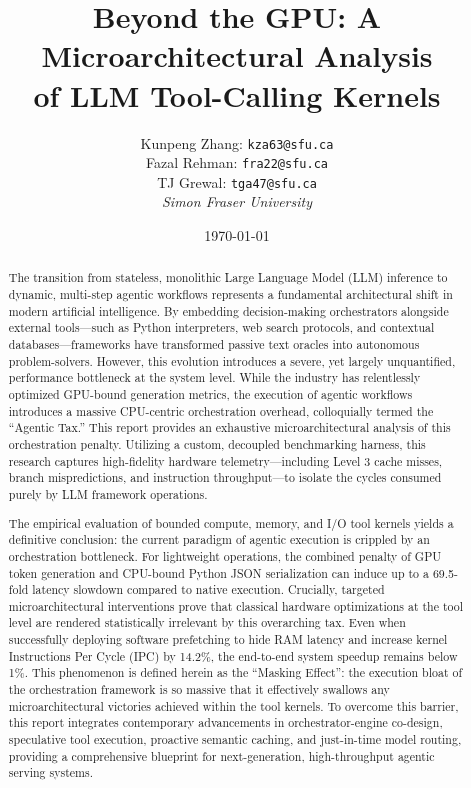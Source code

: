 \documentclass[10pt, letterpaper]{article}
\title{\textbf{Beyond the GPU: A Microarchitectural Analysis \\ \large of LLM Tool-Calling Kernels}}
\author{
    Kunpeng Zhang: \texttt{kza63@sfu.ca} \\
    Fazal Rehman: \texttt{fra22@sfu.ca} \\
    TJ Grewal: \texttt{tga47@sfu.ca} \\
    \vspace{0.5em}
    \textit{Simon Fraser University}
}
\date{\today}
\begin{document}
\maketitle

\begin{abstract}
The transition from stateless, monolithic Large Language Model (LLM) inference to dynamic, multi-step agentic workflows represents a fundamental architectural shift in modern artificial intelligence. By embedding decision-making orchestrators alongside external tools---such as Python interpreters, web search protocols, and contextual databases---frameworks have transformed passive text oracles into autonomous problem-solvers. However, this evolution introduces a severe, yet largely unquantified, performance bottleneck at the system level. While the industry has relentlessly optimized GPU-bound generation metrics, the execution of agentic workflows introduces a massive CPU-centric orchestration overhead, colloquially termed the ``Agentic Tax.'' This report provides an exhaustive microarchitectural analysis of this orchestration penalty. Utilizing a custom, decoupled benchmarking harness, this research captures high-fidelity hardware telemetry---including Level 3 cache misses, branch mispredictions, and instruction throughput---to isolate the cycles consumed purely by LLM framework operations. 

The empirical evaluation of bounded compute, memory, and I/O tool kernels yields a definitive conclusion: the current paradigm of agentic execution is crippled by an orchestration bottleneck. For lightweight operations, the combined penalty of GPU token generation and CPU-bound Python JSON serialization can induce up to a 69.5-fold latency slowdown compared to native execution. Crucially, targeted microarchitectural interventions prove that classical hardware optimizations at the tool level are rendered statistically irrelevant by this overarching tax. Even when successfully deploying software prefetching to hide RAM latency and increase kernel Instructions Per Cycle (IPC) by 14.2\%, the end-to-end system speedup remains below 1\%. This phenomenon is defined herein as the ``Masking Effect'': the execution bloat of the orchestration framework is so massive that it effectively swallows any microarchitectural victories achieved within the tool kernels. To overcome this barrier, this report integrates contemporary advancements in orchestrator-engine co-design, speculative tool execution, proactive semantic caching, and just-in-time model routing, providing a comprehensive blueprint for next-generation, high-throughput agentic serving systems.
\end{abstract}
\end{document}
